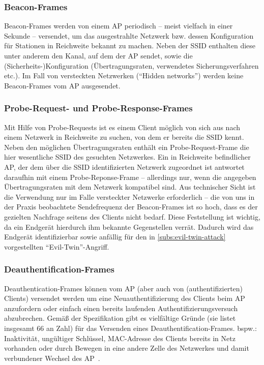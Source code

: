 \subsubsection{Beacon-Frames}
Beacon-Frames werden von einem AP periodisch -- meist vielfach in einer Sekunde -- versendet, um das ausgestrahlte Netzwerk bzw. dessen Konfiguration für Stationen in Reichweite bekannt zu machen. Neben der SSID enthalten diese unter anderem den Kanal, auf dem der AP sendet, sowie die (Sicherheits-)Konfiguration (Übertragungsraten, verwendetes Sicherungsverfahren etc.). Im Fall von versteckten Netzwerken (\enquote{Hidden networks}) werden keine Beacon-Frames vom AP ausgesendet.

\subsubsection{Probe-Request- und Probe-Response-Frames}
Mit Hilfe von Probe-Requests ist es einem Client möglich von sich aus nach einem Netzwerk in Reichweite zu suchen, von dem er bereits die SSID kennt. Neben den möglichen Übertragungsraten enthält ein Probe-Request-Frame die hier wesentliche SSID des gesuchten Netzwerkes. Ein in Reichweite befindlicher AP, der dem über die SSID identifizierten Netzwerk zugeordnet ist antwortet daraufhin mit einem Probe-Reponse-Frame -- allerdings nur, wenn die angegeben Übertragungsraten mit dem Netzwerk kompatibel sind. Aus technischer Sicht ist die Verwendung nur im Falle versteckter Netzwerke erforderlich -- die von uns in der Praxis beobachtete Sendefrequenz der Beacon-Frames ist so hoch, dass es der gezielten Nachfrage seitens des Clients nicht bedarf. Diese Feststellung ist wichtig, da ein Endgerät hierdurch ihm bekannte Gegenstellen verrät. Dadurch wird das Endgerät identifizierbar sowie anfällig für den in \ref{subs:evil-twin-attack} vorgestellten \enquote{Evil-Twin}-Angriff.

\subsubsection{Deauthentification-Frames}\label{subs:deauthentication-frames}
Deauthentication-Frames können vom AP (aber auch von (authentifizierten) Clients) versendet werden um eine Neuauthentifizierung des Clients beim AP anzufordern oder einfach einen bereits laufenden Authentifizierungsversuch abzubrechen. Gemäß der Spezifikation gibt es vielfältige Gründe (sie listet insgesamt 66 an Zahl) für das Versenden eines Deauthentification-Frames. bspw.: Inaktivität, ungültiger Schlüssel, MAC-Adresse des Clients bereits in Netz vorhanden oder durch Bewegen in eine andere Zelle des Netzwerkes und damit verbundener Wechsel des AP~\cite[S. 74, S. 442]{ieee802.11}.


